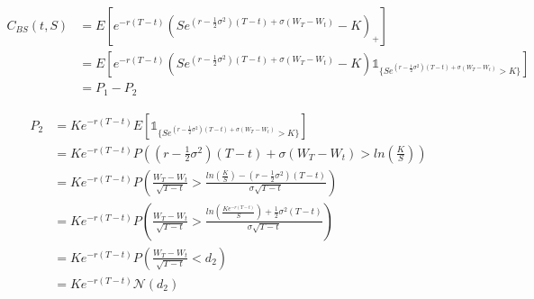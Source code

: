 \documentclass{article}
\theoremstyle{plain}
\theoremstyle{definition}
\begin{document}
\begin{equation}
\begin{split}
C_{BS}(t,S)&=E[e^{-r(T-t)}(Se^{(r-\frac{1}{2}\sigma^2)(T-t)+\sigma(W_T-W_t)}-K)_+]\\
&=E[e^{-r(T-t)}(Se^{(r-\frac{1}{2}\sigma^2)(T-t)+\sigma(W_T-W_t)}-K) \mathds{1}_{\{Se^{(r-\frac{1}{2}\sigma^2)(T-t)+\sigma(W_T-W_t)}>K\}}]\\
&=P_1-P_2
\end{split}
\end{equation}

\begin{equation}
\begin{split}
P_2&=Ke^{-r(T-t)}E[\mathds{1}_{\{Se^{(r-\frac{1}{2}\sigma^2)(T-t)+\sigma(W_T-W_t)}>K\}}]\\
&=Ke^{-r(T-t)}P((r-\frac{1}{2}\sigma^2)(T-t)+\sigma(W_T-W_t)>ln(\frac{K}{S}))\\
&=Ke^{-r(T-t)}P(\frac{W_T-W_t}{\sqrt{T-t}}>\frac{ln(\frac{K}{S})-(r-\frac{1}{2}\sigma^2)(T-t)}{\sigma\sqrt{T-t}})\\
&=Ke^{-r(T-t)}P(\frac{W_T-W_t}{\sqrt{T-t}}>\frac{ln(\frac{Ke^{-r(T-t)}}{S})+\frac{1}{2}\sigma^2(T-t)}{\sigma\sqrt{T-t}})\\
&=Ke^{-r(T-t)}P(\frac{W_T-W_t}{\sqrt{T-t}}<d_2)\\
&=Ke^{-r(T-t)}\mathcal{N}(d_2)
\end{split}
\end{equation}
\end{document}
